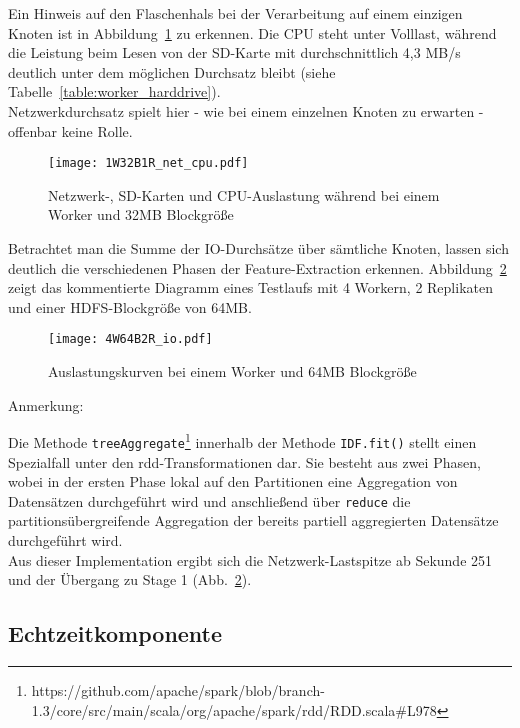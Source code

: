 Ein Hinweis auf den Flaschenhals bei der Verarbeitung auf einem einzigen Knoten ist in Abbildung~\ref{figure:1W32B1R_net_cpu} zu erkennen. Die CPU steht unter Volllast, während die Leistung beim Lesen von der SD-Karte mit durchschnittlich 4,3 MB/s deutlich unter dem möglichen Durchsatz bleibt (siehe Tabelle~\ref{table:worker_harddrive}).\\
Netzwerkdurchsatz spielt hier - wie bei einem einzelnen Knoten zu erwarten - offenbar keine Rolle.

\begin{figure}[ht!]
	\centering
  \texttt{[image: 1W32B1R\_net\_cpu.pdf]}
	\caption{Netzwerk-, SD-Karten und CPU-Auslastung während bei einem Worker und 32MB Blockgröße}
	\label{figure:1W32B1R_net_cpu}
\end{figure}

Betrachtet man die Summe der IO-Durchsätze über sämtliche Knoten, lassen sich deutlich die verschiedenen Phasen der Feature-Extraction erkennen. Abbildung~\ref{figure:4W64B2R_io} zeigt das kommentierte Diagramm eines Testlaufs mit 4 Workern, 2 Replikaten und einer HDFS-Blockgröße von 64MB.

\begin{figure}[ht!]
	\centering
  \texttt{[image: 4W64B2R\_io.pdf]}
	\caption{Auslastungskurven bei einem Worker und 64MB Blockgröße}
	\label{figure:4W64B2R_io}
\end{figure}

\begin{labeling}{Anmerkung:~}
\item[Anmerkung:] Die Methode \lstinline|treeAggregate|\footnote{https://github.com/apache/spark/blob/branch-1.3/core/src/main/scala/org/apache/spark/rdd/RDD.scala\#L978} innerhalb der Methode \lstinline|IDF.fit()| stellt einen Spezialfall unter den \gls{rdd}-Transformationen dar. Sie besteht aus zwei Phasen, wobei in der ersten Phase lokal auf den Partitionen eine Aggregation von Datensätzen durchgeführt wird und anschließend über \lstinline|reduce| die partitionsübergreifende Aggregation der bereits partiell aggregierten Datensätze durchgeführt wird.\\
Aus dieser Implementation ergibt sich die Netzwerk-Lastspitze ab Sekunde 251 und der Übergang zu Stage 1 (Abb.~\ref{figure:4W64B2R_io}).
\end{labeling}

\subsection{Echtzeitkomponente}

